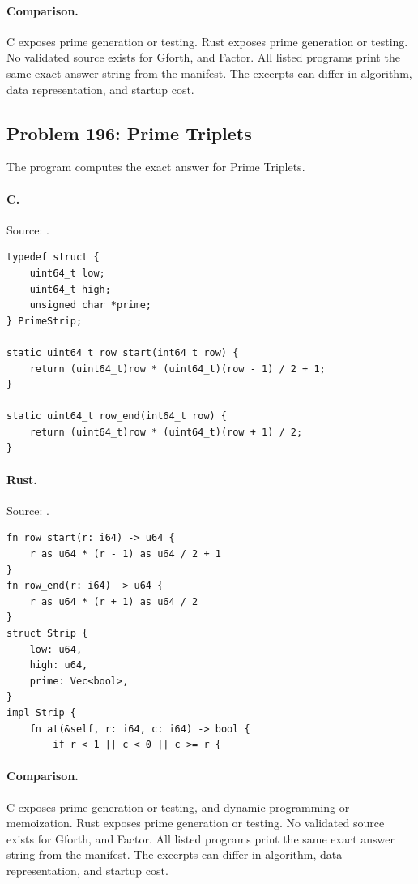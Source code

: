 \paragraph{Comparison.}
C exposes prime generation or testing. Rust exposes prime generation or testing.
No validated source exists for Gforth, and Factor.
All listed programs print the same exact answer string from the manifest. The excerpts can differ in algorithm, data representation, and startup cost.

\subsection{Problem 196: Prime Triplets}
\label{walkthrough:p196}
The program computes the exact answer for Prime Triplets.

\paragraph{C.} Source: .
\begin{lstlisting}
typedef struct {
    uint64_t low;
    uint64_t high;
    unsigned char *prime;
} PrimeStrip;

static uint64_t row_start(int64_t row) {
    return (uint64_t)row * (uint64_t)(row - 1) / 2 + 1;
}

static uint64_t row_end(int64_t row) {
    return (uint64_t)row * (uint64_t)(row + 1) / 2;
}
\end{lstlisting}

\paragraph{Rust.} Source: .
\begin{lstlisting}
fn row_start(r: i64) -> u64 {
    r as u64 * (r - 1) as u64 / 2 + 1
}
fn row_end(r: i64) -> u64 {
    r as u64 * (r + 1) as u64 / 2
}
struct Strip {
    low: u64,
    high: u64,
    prime: Vec<bool>,
}
impl Strip {
    fn at(&self, r: i64, c: i64) -> bool {
        if r < 1 || c < 0 || c >= r {
\end{lstlisting}

\paragraph{Comparison.}
C exposes prime generation or testing, and dynamic programming or memoization. Rust exposes prime generation or testing.
No validated source exists for Gforth, and Factor.
All listed programs print the same exact answer string from the manifest. The excerpts can differ in algorithm, data representation, and startup cost.

